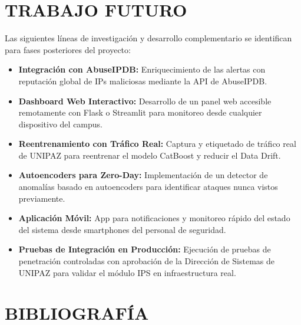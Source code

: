 \documentclass[12pt, letterpaper, oneside]{report}
\begin{document}
\chapter{TRABAJO FUTURO}

Las siguientes líneas de investigación y desarrollo complementario se identifican para fases posteriores del proyecto:

\begin{itemize}[leftmargin=*]
  \item \textbf{Integración con AbuseIPDB:} Enriquecimiento de las alertas con reputación global de IPs maliciosas mediante la API de AbuseIPDB.
  \item \textbf{Dashboard Web Interactivo:} Desarrollo de un panel web accesible remotamente con Flask o Streamlit para monitoreo desde cualquier dispositivo del campus.
  \item \textbf{Reentrenamiento con Tráfico Real:} Captura y etiquetado de tráfico real de UNIPAZ para reentrenar el modelo CatBoost y reducir el Data Drift.
  \item \textbf{Autoencoders para Zero-Day:} Implementación de un detector de anomalías basado en autoencoders para identificar ataques nunca vistos previamente.
  \item \textbf{Aplicación Móvil:} App para notificaciones y monitoreo rápido del estado del sistema desde smartphones del personal de seguridad.
  \item \textbf{Pruebas de Integración en Producción:} Ejecución de pruebas de penetración controladas con aprobación de la Dirección de Sistemas de UNIPAZ para validar el módulo IPS en infraestructura real.
\end{itemize}

\chapter*{BIBLIOGRAFÍA}
\end{document}
